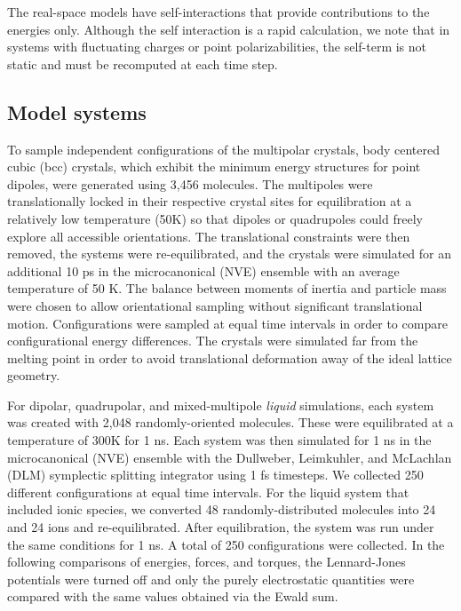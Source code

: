 The real-space models have self-interactions that provide
contributions to the energies only.  Although the self interaction is
a rapid calculation, we note that in systems with fluctuating charges
or point polarizabilities, the self-term is not static and must be
recomputed at each time step.

\subsection{Model systems}
To sample independent configurations of the multipolar crystals, body
centered cubic (bcc) crystals, which exhibit the minimum energy
structures for point dipoles, were generated using 3,456 molecules.
The multipoles were translationally locked in their respective crystal
sites for equilibration at a relatively low temperature (50K) so that
dipoles or quadrupoles could freely explore all accessible
orientations.  The translational constraints were then removed, the
systems were re-equilibrated, and the crystals were simulated for an
additional 10 ps in the microcanonical (NVE) ensemble with an average
temperature of 50 K.  The balance between moments of inertia and
particle mass were chosen to allow orientational sampling without
significant translational motion.  Configurations were sampled at
equal time intervals in order to compare configurational energy
differences.  The crystals were simulated far from the melting point
in order to avoid translational deformation away of the ideal lattice
geometry.

For dipolar, quadrupolar, and mixed-multipole \textit{liquid}
simulations, each system was created with 2,048 randomly-oriented
molecules.  These were equilibrated at a temperature of 300K for 1 ns.
Each system was then simulated for 1 ns in the microcanonical (NVE)
ensemble with the Dullweber, Leimkuhler, and McLachlan (DLM)
symplectic splitting integrator using 1 fs
timesteps.\cite{Dullweber97} We collected 250 different
configurations at equal time intervals. For the liquid system that
included ionic species, we converted 48 randomly-distributed molecules
into 24  and 24  ions and re-equilibrated. After
equilibration, the system was run under the same conditions for 1
ns. A total of 250 configurations were collected. In the following
comparisons of energies, forces, and torques, the Lennard-Jones
potentials were turned off and only the purely electrostatic
quantities were compared with the same values obtained via the Ewald
sum.

